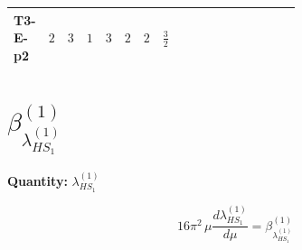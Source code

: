\documentclass[8pt]{article}
\begin{document}
\begin{landscape}
\begin{longtable}{@{}llcccccc >{\raggedright\arraybackslash}p{0.21\linewidth} >{\raggedright\arraybackslash}p{0.21\linewidth} >{\raggedright\arraybackslash}p{0.21\linewidth}@{}}
T3-E-p2 & $2$ & $3$ & $1$ & $3$ & $2$ & $2$ & $\frac{3}{2}$ & \scriptsize\adjustbox{max width=\linewidth}{$\begin{gathered} +8 {\lambda_{12}^{(1)}} {\lambda_{12}^{(\times)}}\end{gathered}$} & \scriptsize\adjustbox{max width=\linewidth}{$\begin{gathered} +6 {\lambda_{12}^{(A)}}^2\end{gathered}$} & \scriptsize\adjustbox{max width=\linewidth}{$\begin{gathered} +6 {\lambda_{12}^{(\times)}}^2\end{gathered}$} \\
\midrule
\bottomrule
\end{longtable}
\clearpage
\section*{$\beta_{\lambda_{HS_1}^{(1)}}^{(1)}$}
\noindent\textbf{Quantity: }$\lambda_{HS_1}^{(1)}$\par\smallskip
\[16\pi^2\,\mu\frac{d \lambda_{HS_1}^{(1)}}{d\mu}=\beta_{\lambda_{HS_1}^{(1)}}^{(1)}\]

\end{landscape}
\end{document}
